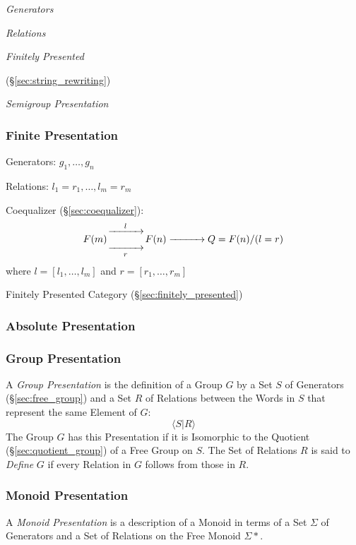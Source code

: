 \emph{Generators}

\emph{Relations}

\emph{Finitely Presented}

(\S\ref{sec:string_rewriting})

\emph{Semigroup Presentation}



\subsubsection{Finite Presentation}\label{sec:finite_presentation}
\cite{awodey06}

Generators: $g_1, \ldots, g_n$

Relations: $l_1 = r_1, \ldots, l_m = r_m$

Coequalizer (\S\ref{sec:coequalizer}):
\[
  F(m) {\xrightarrow[\quad\quad\quad]{l}
    \atop \xrightarrow[r]{\quad\quad\quad}} F(n)
  \xrightarrow{\quad\quad\quad} Q = F(n) / (l = r)
\]
where $l = [l_1, \ldots, l_m]$ and $r = [r_1, \ldots, r_m]$

Finitely Presented Category (\S\ref{sec:finitely_presented})



\subsubsection{Absolute Presentation}\label{sec:absolute_presentation}

\subsubsection{Group Presentation}\label{sec:group_presentation}

A \emph{Group Presentation} is the definition of a Group $G$ by a Set
$S$ of Generators (\S\ref{sec:free_group}) and a Set $R$ of Relations
between the Words in $S$ that represent the same Element of $G$:
\[
  \langle S | R \rangle
\]
The Group $G$ has this Presentation if it is Isomorphic to the
Quotient (\S\ref{sec:quotient_group}) of a Free Group on $S$. The Set
of Relations $R$ is said to \emph{Define} $G$ if every Relation in $G$
follows from those in $R$.



\subsubsection{Monoid Presentation}\label{sec:monoid_presentation}

A \emph{Monoid Presentation} is a description of a Monoid in terms of
a Set $\Sigma$ of Generators and a Set of Relations on the Free Monoid
$\Sigma*$.



